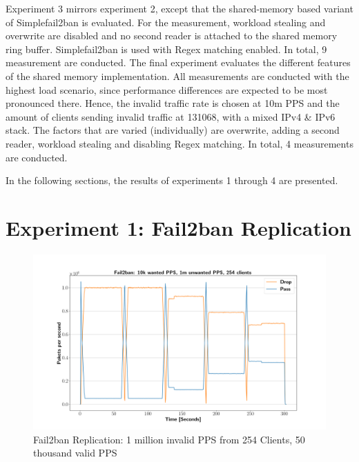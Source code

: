 Experiment 3 mirrors experiment 2, except that the shared-memory based variant of Simplefail2ban is evaluated. For the
measurement, workload stealing and overwrite are disabled and no second reader is attached to the shared memory ring buffer. Simplefail2ban is used with \ac{Regex} matching enabled. In total, 9 measurement are conducted.    
The final experiment evaluates the different features of the shared memory implementation. All measurements are conducted with the highest load scenario, since performance 
differences are expected to be most pronounced there. Hence, the invalid traffic rate is chosen at 10m \ac{PPS} and the amount of clients sending invalid traffic at 131068,
with a mixed \ac{IPv4} \& \ac{IPv6} stack. The factors that are varied (individually) are overwrite, adding a second reader, workload stealing and disabling \ac{Regex} matching.
In total, 4 measurements are conducted.    
\par
In the following sections, the results of experiments 1 through 4 are presented.

\pagebreak

\section{Experiment 1: Fail2ban Replication}

\begin{figure}[h!]
    \centerline{\includegraphics[width=1.2\textwidth]{images/fail2ban_v50k_iv1m_c254.png}}
    \caption[Fail2ban Replication: 1m PPS, 254 Clients]{Fail2ban Replication: 1 million invalid \ac{PPS} from 254 Clients, 50 thousand valid \ac{PPS}}
	\label{fig:fail2ban:1m}
\end{figure}

